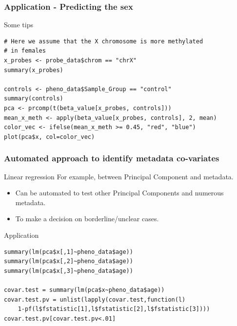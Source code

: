 \documentclass[10pt]{beamer}
\newenvironment{xframe}[2][]
  {\begin{frame}[fragile,environment=xframe,#1]
  \frametitle{#2}}
  {\end{frame}}
\begin{document}
\begin{xframe}[shrink=5]{Application - Predicting the sex}
  \begin{exampleblock}{Some tips}
\begin{verbatim}
# Here we assume that the X chromosome is more methylated
# in females
x_probes <- probe_data$chrom == "chrX"
summary(x_probes)

controls <- pheno_data$Sample_Group == "control"
summary(controls)
pca <- prcomp(t(beta_value[x_probes, controls]))
mean_x_meth <- apply(beta_value[x_probes, controls], 2, mean)
color_vec <- ifelse(mean_x_meth >= 0.45, "red", "blue")
plot(pca$x, col=color_vec)
\end{verbatim}  
  \end{exampleblock}
\end{xframe}


\begin{xframe}{Automated approach to identify metadata co-variates}
  \begin{block}{Linear regression}
    For example, between Principal Component and metadata. 
    \begin{itemize}
    \item Can be automated to test other Principal Components and numerous metadata. 
    \item To make a decision on borderline/unclear cases.
    \end{itemize}    
  \end{block}
  \begin{exampleblock}{Application}
\begin{verbatim}
summary(lm(pca$x[,1]~pheno_data$age))
summary(lm(pca$x[,2]~pheno_data$age))
summary(lm(pca$x[,3]~pheno_data$age))

covar.test = summary(lm(pca$x~pheno_data$age))
covar.test.pv = unlist(lapply(covar.test,function(l)
    1-pf(l$fstatistic[1],l$fstatistic[2],l$fstatistic[3])))
covar.test.pv[covar.test.pv<.01]
\end{verbatim}  
  \end{exampleblock}
\end{xframe}
\end{document}
